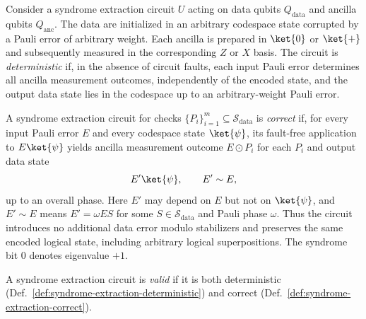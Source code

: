 
\begin{definition}
\label{def:syndrome-extraction-deterministic}
Consider a syndrome extraction circuit $U$ acting on data qubits
$Q_{\text{data}}$ and ancilla qubits $Q_{\text{anc}}$. The data are
initialized in an arbitrary codespace state corrupted by a Pauli error
of arbitrary weight. Each ancilla is prepared in $\ket{0}$ or
$\ket{+}$ and subsequently measured in the corresponding $Z$ or $X$
basis. The circuit is \emph{deterministic} if, in the absence of circuit
faults, each input Pauli error determines all ancilla measurement outcomes,
independently of the encoded state, and the output data state lies in
the codespace up to an arbitrary-weight Pauli error.
\end{definition}

\begin{definition}
\label{def:syndrome-extraction-correct}
A syndrome extraction circuit for checks
$\{P_i\}_{i=1}^{m}\subseteq\mathcal{S}_{\mathrm{data}}$ is
\emph{correct} if, for every input Pauli error $E$ and every codespace
state $\ket{\psi}$, its fault-free application to $E\ket{\psi}$ yields
ancilla measurement outcome $E\odot P_i$ for each $P_i$ and output data
state
\[
    E'\ket{\psi}, \qquad E'\sim E,
\]
up to an overall phase. Here $E'$ may depend on $E$ but not on
$\ket{\psi}$, and $E'\sim E$ means $E'=\omega ES$ for some
$S\in\mathcal{S}_{\mathrm{data}}$ and Pauli phase $\omega$.
Thus the circuit introduces no additional data error modulo stabilizers
and preserves the same encoded logical state, including arbitrary
logical superpositions. The syndrome bit $0$ denotes eigenvalue $+1$.
\end{definition}

\begin{definition}
\label{def:syndrome-extraction-valid}
A syndrome extraction circuit is \emph{valid} if it is both deterministic
(Def.~\ref{def:syndrome-extraction-deterministic}) and correct
(Def.~\ref{def:syndrome-extraction-correct}).
\end{definition}

